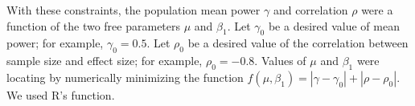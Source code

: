 \documentclass[jou]{apa6} %
\begin{document}
With these constraints, the population mean power $\gamma$ and correlation $\rho$ were a function of the two free parameters $\mu$ and $\beta_1$. Let $\gamma_0$ be a desired value of mean power; for example, $\gamma_0 = 0.5$. Let $\rho_0$ be a desired value of the correlation between sample size and effect size; for example, $\rho_0 = -0.8$. Values of $\mu$ and $\beta_1$ were locating by numerically minimizing the function $f(\mu,\beta_1) = |\gamma-\gamma_0|+|\rho-\rho_0|$. We used R's  function.



~
\end{document}
